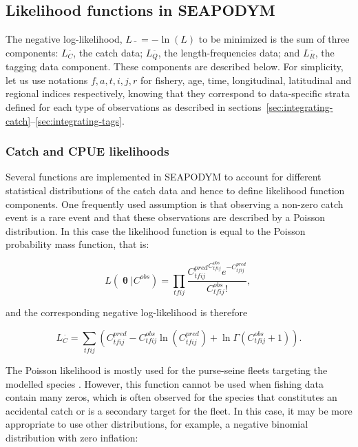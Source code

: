\subsection{Likelihood functions in SEAPODYM} \label{sec:likes}

The negative log-likelihood, $L\bar{\text{ }}=-\ln(L)$ to be minimized is the sum of three components: $L_{\scriptscriptstyle  C}^{\bar{\text{ }}}$, the catch data; $L_{\scriptscriptstyle  Q}^{\bar{\text{ }}}$, the length-frequencies data; and $L_{\scriptscriptstyle  R}^{\bar{\text{ }}}$, the tagging data component. These components are described below. For simplicity, let us use notations $f,a,t,i,j,r$ for fishery, age, time, longitudinal, latitudinal and regional indices respectively, knowing that they correspond to data-specific strata defined for each type of observations as described in sections~\ref{sec:integrating-catch}--\ref{sec:integrating-tags}. 

\subsubsection{Catch and CPUE likelihoods}\label{sec:c-like} 

Several functions are implemented in SEAPODYM to account for different statistical distributions of the catch data and hence to define likelihood function components. One frequently used assumption is that observing a non-zero catch event is a rare event and that these observations are described by a Poisson distribution. In this case the likelihood function is equal to the Poisson probability mass function, that is: 

\begin{equation}
L\left(\boldsymbol \uptheta|C^{obs}\right) =
\prod\limits_{tfij}\frac{ {C^{pred}_{tfij}}^{C^{obs}_{tfij}}
e^{-C^{pred}_{tfij}}}{C^{obs}_{tfij}!} {\text {, }} 
\end{equation}

\noindent and the corresponding negative log-likelihood is therefore

\begin{equation}\label{eq:C-like-poisson}
L_{\scriptscriptstyle  C}^{\bar{\text{ }}} =
\sum\limits_{tfij}\left({C^{pred}_{tfij}} - C^{obs}_{tfij} \ln(C^{pred}_{tfij}) + 
\ln\Gamma (C^{obs}_{tfij}+1)\right).  
\end{equation}

The Poisson likelihood is mostly used for the purse-seine fleets targeting the modelled species \citep*[see e.g.,][]{Senina08}. However, this function cannot be used when fishing data contain many zeros, which is often observed for the species that constitutes an accidental catch or is a secondary target for the fleet. In this case, it may be more appropriate to use other distributions, for example, a negative binomial distribution with zero inflation: 

